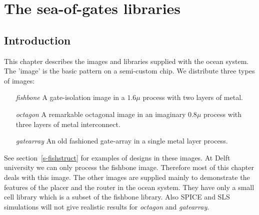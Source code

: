 
\chapter{The sea-of-gates libraries}
\label{s-oplib}
\section{Introduction}
This chapter describes the images and libraries supplied with the
{\smc ocean} system. The 'image' is the basic pattern on a
semi-custom chip. We distribute three types of images:
\begin{itemize}
\item[{\em fishbone}]
A gate-isolation image in a $1.6 \mu$ process with two layers of metal. 
\item[{\em octagon}]
A remarkable octagonal image in an imaginary $0.8 \mu$ process with three
layers of metal interconnect.
\item[{\em gatearray}]
An old fashioned gate-array in a single metal layer process.
\end{itemize}
See section~\ref{s-fishstruct} for examples of designs in these
images.  At Delft university we can only process the fishbone
image.  Therefore most of this chapter deals with this image. The
other images are supplied mainly to demonstrate the features of
the placer and the router in the {\sc ocean} system.  They have
only a small cell library which is a subset of the fishbone
library. Also SPICE and SLS simulations will not give realistic
results for {\sl octagon} and {\sl gatearray}.

